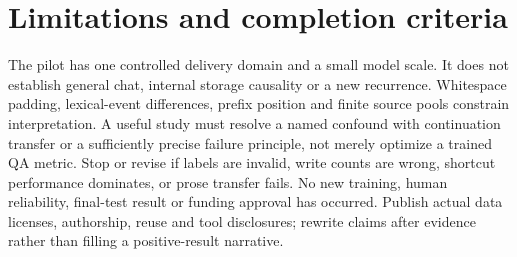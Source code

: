 \documentclass[11pt,a4paper]{article}
\begin{document}
\section{Limitations and completion criteria}
The pilot has one controlled delivery domain and a small model scale. It does
not establish general chat, internal storage causality or a new recurrence.
Whitespace padding, lexical-event differences, prefix position and finite
source pools constrain interpretation. A useful study must resolve a named
confound with continuation transfer or a sufficiently precise failure principle,
not merely optimize a trained QA metric. Stop or revise if labels are invalid,
write counts are wrong, shortcut performance dominates, or prose transfer fails.
No new training, human reliability, final-test result or funding approval has
occurred. Publish actual data licenses, authorship, reuse and tool disclosures;
rewrite claims after evidence rather than filling a positive-result narrative.

\end{document}
